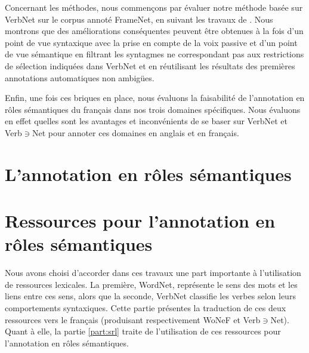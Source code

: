 \documentclass[oneside,parskip]{scrbook}
\newcommand{\verbenet}{Verb$\ni$Net}
\begin{document}
Concernant les méthodes, nous commençons par évaluer notre méthode basée sur
VerbNet sur le corpus annoté FrameNet, en suivant les travaux de
\cite{swier2005exploiting}.  Nous montrons que des améliorations conséquentes
peuvent être obtenues à la fois d'un point de vue syntaxique avec la prise en
compte de la voix passive et d'un point de vue sémantique en filtrant les
syntagmes ne correspondant pas aux restrictions de sélection indiquées dans
VerbNet et en réutilisant les résultats des premières annotations automatiques
non ambigües.

Enfin, une fois ces briques en place, nous évaluons la faisabilité de
l'annotation en rôles sémantiques du français dans nos trois domaines
spécifiques. Nous évaluons en effet quelles sont les avantages et inconvénients
de se baser sur VerbNet et \verbenet{} pour annoter ces domaines en anglais et
en français.


\setcounter{tocdepth}{3}
\tableofcontents

\mainmatter

\part{L'annotation en rôles sémantiques}





\part{Ressources pour l'annotation en rôles sémantiques}
\label{part:translation}


Nous avons choisi d'accorder dans ces travaux une part importante à
l'utilisation de ressources lexicales. La première, WordNet, représente le sens
des mots et les liens entre ces sens, alors que la seconde, VerbNet classifie
les verbes selon leurs comportements syntaxiques. Cette partie présentes la
traduction de ces deux ressources vers le français (produisant respectivement
WoNeF et \verbenet{}). Quant à elle, la partie \ref{part:srl} traite de
l'utilisation de ces ressources pour l'annotation en rôles sémantiques.


\end{document}
